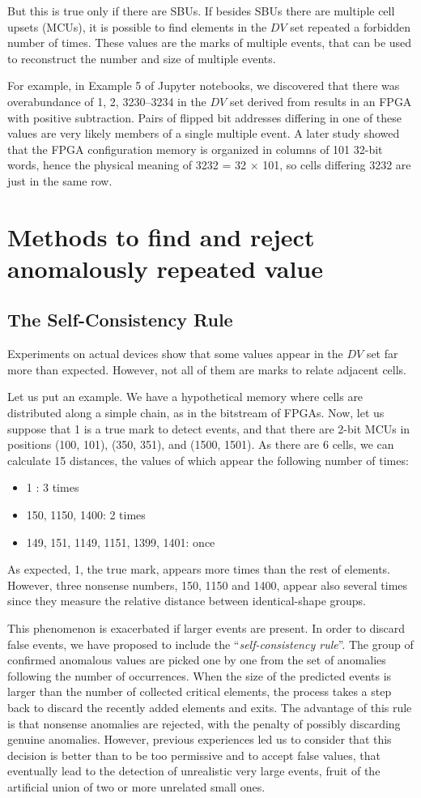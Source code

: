 But this is true only if there are SBUs. If besides SBUs there are multiple cell upsets (MCUs), it is possible to find elements in the \(DV\) set repeated a forbidden number of times. These values are the marks of multiple events, that can be used to reconstruct the number and size of multiple events.

For example, in Example 5 of Jupyter notebooks, we discovered that there was overabundance of 1, 2, 3230--3234 in the \(DV\) set derived from results in an FPGA with positive subtraction. Pairs of flipped bit addresses differing in one of these values are very likely members of a single multiple event. A later study showed that the FPGA configuration memory is organized in columns of 101 32-bit words, hence the physical meaning of 3232 = 32 $\times$ 101, so cells differing 3232 are just in the same row.
%
\section{Methods to find and reject anomalously repeated value}
%
\subsection{The Self-Consistency Rule}\label{Subsec:SelfConsistencyRule}
Experiments on actual devices show that some values appear in the \(DV\) set far more than expected. However, not all of them are marks to relate adjacent cells. 

Let us put an example. We have a hypothetical memory where cells are distributed along a simple chain, as in the bitstream of FPGAs. Now, let us suppose that 1 is a true mark to detect events, and that there are 2-bit MCUs in positions (100, 101), (350, 351), and (1500, 1501). As there are 6 cells, we can calculate 15 distances, the values of which appear the following number of times:
%
\begin{itemize}
	\item 1 : 3 times
	\item 150, 1150, 1400: 2 times
	\item 149, 151, 1149, 1151, 1399, 1401: once
\end{itemize}
%
As expected, 1, the true mark, appears more times than the rest of elements. However, three nonsense numbers, 150, 1150 and 1400, appear also several times since they measure the relative distance between identical-shape groups.

This phenomenon is exacerbated if larger events are present. In order to discard false events, we have proposed to include the ``\textit{self-consistency rule}''. The group of confirmed anomalous values are picked one by one from the set of anomalies following the number of occurrences. When the size of the predicted events is larger than the number of collected critical elements, the process takes a step back to discard the recently added elements and exits. The advantage of this rule is that nonsense anomalies are rejected, with the penalty of possibly discarding genuine anomalies. However, previous experiences led us to consider that this decision is better than to be too permissive and to accept false values, that eventually lead to the detection of unrealistic very large events, fruit of the artificial union of two or more unrelated small ones.
%
